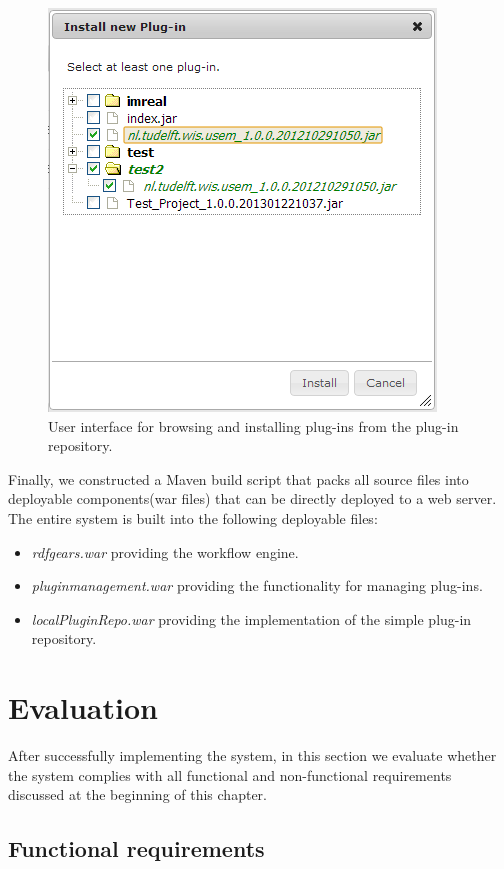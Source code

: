 \begin{figure}[h!]
  \centering
  	\includegraphics[scale=0.6]{plug-in/ui/repo.png}
  \caption{User interface for browsing and installing plug-ins from the plug-in repository.}
  \label{repo_ui}
\end{figure}

Finally, we constructed a Maven build script that packs all source files into deployable components(war files) that can be directly deployed to a web server. The entire system is built into the following deployable files:
\begin{itemize}
	\item \textit{rdfgears.war} providing the workflow engine.
	\item \textit{pluginmanagement.war} providing the functionality for managing plug-ins.
	\item \textit{localPluginRepo.war} providing the implementation of the simple plug-in repository.
\end{itemize}

\section{Evaluation}
\label{sec:eval}

After successfully implementing the system, in this section we evaluate whether the system complies with all functional and non-functional requirements discussed at the beginning of this chapter. 

\subsection{Functional requirements}

